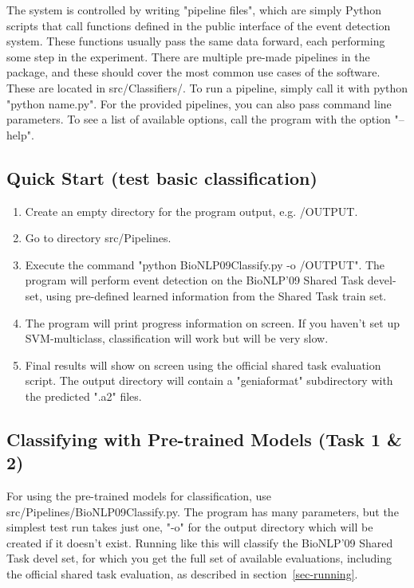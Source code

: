 \documentclass[a4paper,12pt]{article}
\begin{document}
The system is controlled by writing "pipeline files", which are simply Python
scripts that call functions defined in the public interface of the event
detection system. These functions usually pass the same data forward, each
performing some step in the experiment. There are multiple pre-made pipelines in
the package, and these should cover the most common use cases of the software.
These are located in src/Classifiers/. To run a pipeline, simply call it with
python "python name.py". For the provided pipelines, you can also pass command
line parameters. To see a list of available options, call the program with the
option "--help".

\subsection{Quick Start (test basic classification)}

\begin{enumerate}

\item Create an empty directory for the program output, e.g. /OUTPUT.

\item Go to directory src/Pipelines.

\item Execute the command "python BioNLP09Classify.py -o /OUTPUT". The program will
perform event detection on the BioNLP'09 Shared Task devel-set, using pre-defined
learned information from the Shared Task train set.

\item The program will print progress information on screen. If you haven't set up
SVM-multiclass, classification will work but will be very slow.

\item Final results will show on screen using the official shared task evaluation
script. The output directory will contain a "geniaformat" subdirectory with the
predicted ".a2" files.

\end{enumerate}

\subsection{Classifying with Pre-trained Models (Task 1 \& 2)}

For using the pre-trained models for classification, use
src/Pipelines/BioNLP09Classify.py. The program has many parameters, but the
simplest test run takes just one, "-o" for the output directory which will be
created if it doesn't exist. Running like this will classify the BioNLP'09 Shared
Task devel set, for which you get the full set of available evaluations,
including the official shared task evaluation, as described in
section~\ref{sec-running}.
\end{document}
